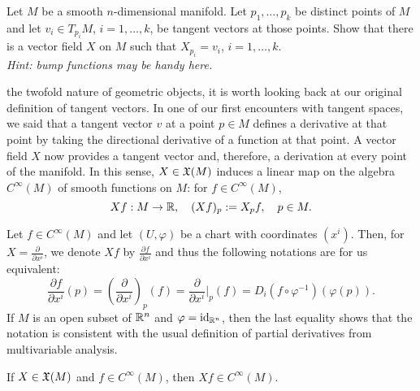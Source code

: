 \begin{exercise}
	Let $M$ be a smooth $n$-dimensional manifold.
	Let $p_1,\ldots,p_k$ be distinct points of $M$ and let $v_i\in T_{p_i}M$, $i=1,\ldots,k$, be tangent vectors at those points.
	Show that there is a vector field $X$ on $M$ such that $X_{p_i} = v_i$, $i=1,\ldots, k$.\\
	\textit{\small Hint: bump functions may be handy here.}
\end{exercise}

 the twofold nature of geometric objects, it is worth looking back at our original definition of tangent vectors.
In one of our first encounters with tangent spaces, we said that a tangent vector $v$ at a point $p\in M$ defines a derivative at that point by taking the directional derivative of a function at that point.
A vector field $X$ now provides a tangent vector and, therefore, a derivation at every point of the manifold.
In this sense, $X\in\mathfrak{X}(M)$ induces a linear map on the algebra $C^\infty(M)$ of smooth functions on $M$: for $f\in C^\infty(M)$,
\begin{equation}\label{eq:diff_directional_derivative}
	Xf : M\to\mathbb{R}, \quad
	(Xf)_p := X_p f, \quad p\in M.
\end{equation}

\begin{notation}\label{notation:derivative}
	Let $f\in C^\infty(M)$ and let $(U, \varphi)$ be a chart with coordinates $(x^i)$.
	Then, for $X = \frac{\partial}{\partial x^i}$, we denote $Xf$ by $\frac{\partial f}{\partial x^i}$ and thus the following notations are for us equivalent:
	\begin{equation}
		\frac{\partial f}{\partial x^i}(p)
		= \left(\frac{\partial}{\partial x^i}\right)_p(f)
		= \frac{\partial}{\partial x^i}\Big|_p(f)
		= D_i(f\circ\varphi^{-1})(\varphi(p)).
	\end{equation}
	If $M$ is an open subset of $\mathbb{R}^n$ and $\varphi=\operatorname{id}_{\mathbb{R}^n}$, then the last equality shows that the notation is consistent with the usual definition of partial derivatives from multivariable analysis.
\end{notation}

\begin{exercise}
	If $X\in\mathfrak{X}(M)$ and $f\in C^\infty(M)$, then $Xf\in C^\infty(M)$.
\end{exercise}

